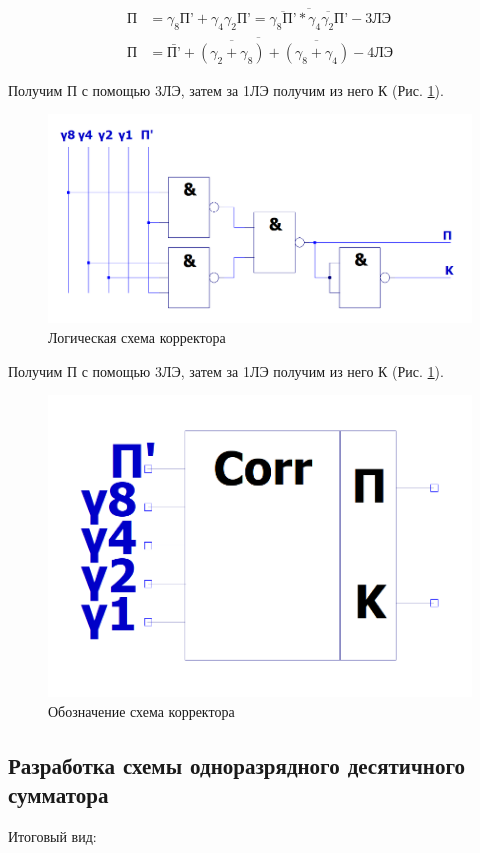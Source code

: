 \documentclass[a4paper,14pt]{article}
\begin{document}
\begin{equation*}
\begin{aligned}
\text{П} &= \gamma_8\text{П'} + \gamma_4\gamma_2\text{П'} = \overline{\overline{\gamma_8\text{П'}}*\overline{\gamma_4\gamma_2\text{П'}}} - \text{3ЛЭ} \\
\text{П} &= \overline{\bar{\text{П'}} + \overline{(\gamma_2+\gamma_8)} + \overline{(\gamma_8+\gamma_4)}} - \text{4ЛЭ}
\end{aligned}
\end{equation*}

Получим П с помощью 3ЛЭ, затем за 1ЛЭ получим из него К (Рис. \ref{fig:corr}).

\begin{figure}[H]
	\centering
	\includegraphics[width=\linewidth]{schemas/corr}
	\caption{Логическая схема корректора}
	\label{fig:corr}
\end{figure}

Получим П с помощью 3ЛЭ, затем за 1ЛЭ получим из него К (Рис. \ref{fig:corr}).

\begin{figure}[H]
	\centering
	\includegraphics[width=0.3\linewidth]{schemas/corr_el}
	\caption{Обозначение схема корректора}
	\label{fig:corr_el}
\end{figure}

\subsection{Разработка схемы одноразрядного десятичного сумматора}

Итоговый вид:
\end{document}
